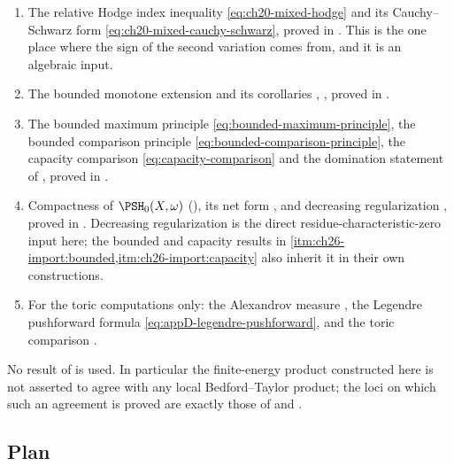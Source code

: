 \begin{enumerate}
\item\label{itm:ch26-import:hodge}
 The relative Hodge index inequality \eqref{eq:ch20-mixed-hodge} and its
 Cauchy--Schwarz form \eqref{eq:ch20-mixed-cauchy-schwarz}, proved in
 .  This is the one place where the sign of the
 second variation comes from, and it is an algebraic input.
\item\label{itm:ch26-import:bounded}
 The bounded monotone extension  and its
 corollaries ,
 , proved in .
\item\label{itm:ch26-import:capacity}
 The bounded maximum principle \eqref{eq:bounded-maximum-principle}, the
 bounded comparison principle \eqref{eq:bounded-comparison-principle}, the
 capacity comparison \eqref{eq:capacity-comparison} and the domination
 statement of , proved in
 .
\item\label{itm:ch26-import:compactness}
 Compactness of $\PSH_0(X,\omega)$ (), its net
 form , and decreasing regularization
 , proved in
 .  Decreasing regularization is the direct
 residue-characteristic-zero input here; the bounded and capacity results in
 \cref{itm:ch26-import:bounded,itm:ch26-import:capacity} also inherit it in
 their own constructions.
\item\label{itm:ch26-import:convex}
 For the toric computations only: the Alexandrov measure
 , the Legendre pushforward formula
 \eqref{eq:appD-legendre-pushforward}, and the toric comparison
 .
\end{enumerate}

No result of  is used.  In particular the finite-energy product
constructed here is not asserted to agree with any local Bedford--Taylor
product; the loci on which such an agreement is proved are exactly those of
 and .

\subsection{Plan}
\label{sec:ch26-plan}

